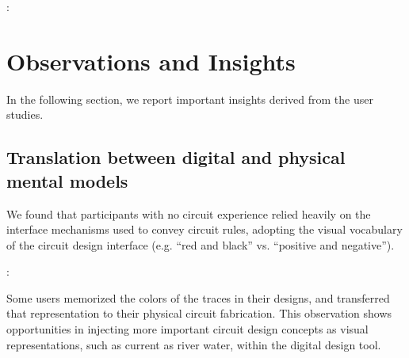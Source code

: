 \documentclass{sigchi}
\begin{document}
  \begin{myquote}
   \vspace{-2pt}
    :
    \vspace{-2pt}
  \end{myquote}

\section{Observations and Insights}
In the following section, we report important insights derived from the user studies.

  \subsection{Translation between digital and physical mental models}
  We found that participants with no circuit experience relied heavily on the interface mechanisms used to convey circuit rules, adopting the visual vocabulary of the circuit design interface (e.g. ``red and black'' vs. ``positive and negative'').
  \begin{myquote}
   \vspace{-2pt}
    :
    \vspace{-2pt}
  \end{myquote}
 Some users memorized the colors of the traces in their designs, and transferred that representation to their physical circuit fabrication. This observation shows opportunities in injecting more important circuit design concepts as visual representations, such as current as river water, within the digital design tool.
  
\end{document}
